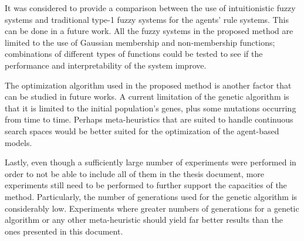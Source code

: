 It was considered to provide a comparison between the use of intuitionistic
fuzzy systems and traditional type-1 fuzzy systems for the agents' rule
systems. This can be done in a future work. All the fuzzy systems in the
proposed method are limited to the use of Gaussian membership and non-membership
functions; combinations of different types of functions could be tested to see
if the performance and interpretability of the system improve.

The optimization algorithm used in the proposed method is another factor that
can be studied in future works. A current limitation of the genetic algorithm is
that it is limited to the initial population's genes, plus some mutations
occurring from time to time. Perhaps meta-heuristics that are suited to handle
continuous search spaces would be better suited for the optimization of the
agent-based models.

Lastly, even though a sufficiently large number of experiments were performed in
order to not be able to include all of them in the thesis document, more
experiments still need to be performed to further support the capacities of the
method. Particularly, the number of generations used for the genetic algorithm
is considerably low. Experiments where greater numbers of generations for a
genetic algorithm or any other meta-heuristic should yield far better results
than the ones presented in this document.
